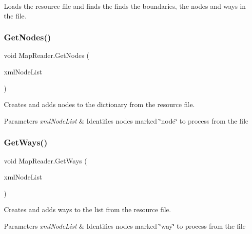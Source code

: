 Loads the resource file and finds the finds the boundaries, the nodes and ways in the file. 

\mbox{\label{class_map_reader_a30a5de63f453fd1f3e2160916126331b}} 
\subsubsection{\texorpdfstring{GetNodes()}{GetNodes()}}
{\footnotesize\ttfamily void Map\+Reader.\+Get\+Nodes (\begin{DoxyParamCaption}\item[{Xml\+Node\+List}]{xml\+Node\+List }\end{DoxyParamCaption})\hspace{0.3cm}{\ttfamily [private]}}



Creates and adds nodes to the dictionary from the resource file. 


\begin{DoxyParams}{Parameters}
{\em xml\+Node\+List} & Identifies nodes marked \char`\"{}node\char`\"{} to process from the file\\
\hline
\end{DoxyParams}
\mbox{\label{class_map_reader_a483bef8b5e6eb6a495e6be83891cadb0}} 
\subsubsection{\texorpdfstring{GetWays()}{GetWays()}}
{\footnotesize\ttfamily void Map\+Reader.\+Get\+Ways (\begin{DoxyParamCaption}\item[{Xml\+Node\+List}]{xml\+Node\+List }\end{DoxyParamCaption})\hspace{0.3cm}{\ttfamily [private]}}



Creates and adds ways to the list from the resource file. 


\begin{DoxyParams}{Parameters}
{\em xml\+Node\+List} & Identifies nodes marked \char`\"{}way\char`\"{} to process from the file\\
\hline
\end{DoxyParams}
\mbox{\label{class_map_reader_a35c17d19f80254a34257192f90688592}} 
